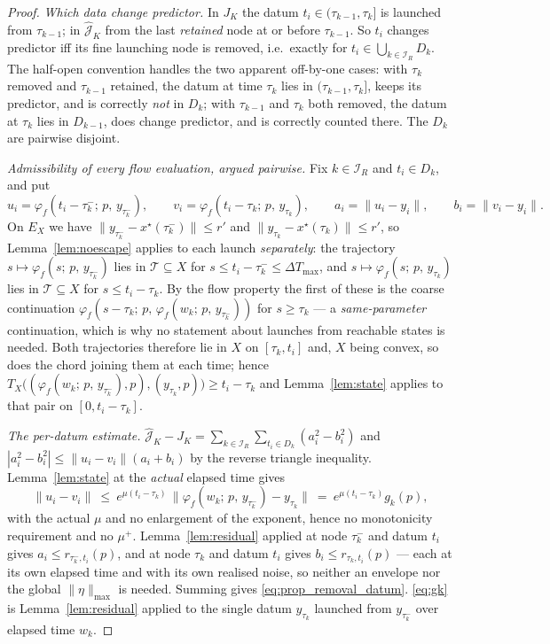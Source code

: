 \documentclass[11pt]{article}
\theoremstyle{remark}\newtheorem{remark}{Remark}
\newcommand{\norm}[1]{\lVert #1\rVert}
\newcommand{\flow}[3]{\varphi_f(#1;\,#2,\,#3)}
\newcommand{\hatJ}{\hat{\mathcal J}}
\begin{document}
\begin{proof}
\emph{Which data change predictor.} In $J_K$ the datum $t_i\in(\tau_{k-1},\tau_k]$ is launched from $\tau_{k-1}$; in $\hatJ_K$ from the last \emph{retained} node at or before $\tau_{k-1}$. So $t_i$ changes predictor iff its fine launching node is removed, i.e.\ exactly for $t_i\in\bigcup_{k\in\mathcal I_R}D_k$. The half-open convention handles the two apparent off-by-one cases: with $\tau_k$ removed and $\tau_{k-1}$ retained, the datum at time $\tau_k$ lies in $(\tau_{k-1},\tau_k]$, keeps its predictor, and is correctly \emph{not} in $D_k$; with $\tau_{k-1}$ and $\tau_k$ both removed, the datum at $\tau_k$ lies in $D_{k-1}$, does change predictor, and is correctly counted there. The $D_k$ are pairwise disjoint.

\emph{Admissibility of every flow evaluation, argued pairwise.} Fix $k\in\mathcal I_R$ and $t_i\in D_k$, and put
\[
u_i=\flow{t_i-\tau_k^{-}}{p}{y_{\tau_k^{-}}},\qquad
v_i=\flow{t_i-\tau_k}{p}{y_{\tau_k}},\qquad
a_i=\norm{u_i-y_i},\qquad b_i=\norm{v_i-y_i}.
\]
On $E_X$ we have $\norm{y_{\tau_k^{-}}-x^\star(\tau_k^{-})}\le r'$ and $\norm{y_{\tau_k}-x^\star(\tau_k)}\le r'$, so Lemma~\ref{lem:noescape} applies to each launch \emph{separately}: the trajectory $s\mapsto\flow{s}{p}{y_{\tau_k^{-}}}$ lies in $\mathcal T\subseteq X$ for $s\le t_i-\tau_k^{-}\le\Delta T_{\max}$, and $s\mapsto\flow{s}{p}{y_{\tau_k}}$ lies in $\mathcal T\subseteq X$ for $s\le t_i-\tau_k$. By the flow property the first of these is the coarse continuation $\flow{s-\tau_k}{p}{\flow{w_k}{p}{y_{\tau_k^{-}}}}$ for $s\ge\tau_k$ --- a \emph{same-parameter} continuation, which is why no statement about launches from reachable states is needed. Both trajectories therefore lie in $X$ on $[\tau_k,t_i]$ and, $X$ being convex, so does the chord joining them at each time; hence $T_X\big((\flow{w_k}{p}{y_{\tau_k^{-}}},p),(y_{\tau_k},p)\big)\ge t_i-\tau_k$ and Lemma~\ref{lem:state} applies to that pair on $[0,t_i-\tau_k]$.

\emph{The per-datum estimate.} $\hatJ_K-J_K=\sum_{k\in\mathcal I_R}\sum_{t_i\in D_k}(a_i^2-b_i^2)$ and $|a_i^2-b_i^2|\le\norm{u_i-v_i}(a_i+b_i)$ by the reverse triangle inequality. Lemma~\ref{lem:state} at the \emph{actual} elapsed time gives
\[
\norm{u_i-v_i}\ \le\ e^{\mu(t_i-\tau_k)}\,\big\lVert\flow{w_k}{p}{y_{\tau_k^{-}}}-y_{\tau_k}\big\rVert
\ =\ e^{\mu(t_i-\tau_k)}g_k(p),
\]
with the actual $\mu$ and no enlargement of the exponent, hence no monotonicity requirement and no $\mu^{+}$. Lemma~\ref{lem:residual} applied at node $\tau_k^{-}$ and datum $t_i$ gives $a_i\le r_{\tau_k^{-},t_i}(p)$, and at node $\tau_k$ and datum $t_i$ gives $b_i\le r_{\tau_k,t_i}(p)$ --- each at its own elapsed time and with its own realised noise, so neither an envelope nor the global $\norm\eta_{\max}$ is needed. Summing gives \eqref{eq:prop_removal_datum}. \eqref{eq:gk} is Lemma~\ref{lem:residual} applied to the single datum $y_{\tau_k}$ launched from $y_{\tau_k^{-}}$ over elapsed time $w_k$.
\end{proof}
\end{document}
